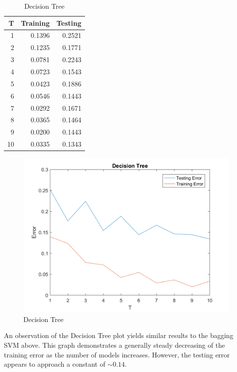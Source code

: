 \documentclass[12pt, letterpaper]{report}
\begin{document}
\begin{table}[H]
	\centering
	\begin{tabular}{ |r|r|r| }
		\hline
		\textbf{T} & \textbf{Training} & \textbf{Testing} \\
		\hline
		1 & 0.1396 & 0.2521 \\
		\hline
		2 & 0.1235 & 0.1771 \\
		\hline
		3 & 0.0781 & 0.2243 \\
		\hline
		4 & 0.0723 & 0.1543 \\
		\hline
		5 & 0.0423 & 0.1886 \\
		\hline
		6 & 0.0546 & 0.1443 \\
		\hline
		7 & 0.0292 & 0.1671 \\
		\hline
		8 & 0.0365 & 0.1464 \\
		\hline
		9 & 0.0200 & 0.1443 \\
		\hline
		10 & 0.0335 & 0.1343 \\
		\hline
	\end{tabular}
	\caption{Decision Tree}
\end{table}


\begin{figure}[H]
	\centering
	\includegraphics[width=0.7\columnwidth]{decision_tree.png}
	\caption{Decision Tree}
\end{figure}


An observation of the Decision Tree plot yields similar results to the bagging SVM above. This graph demonstrates a generally steady decreasing of the training error as the number of models increases. However, the testing error appears to approach a constant of $\sim 0.14$.
\end{document}
